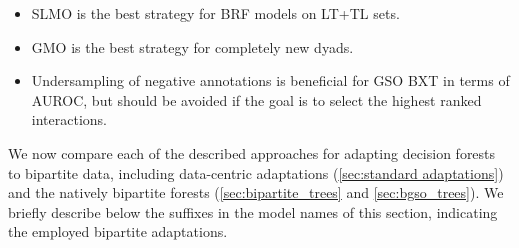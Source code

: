 \begin{mdframed}[frametitle={Key findings}]
    \begin{itemize}
        \item SLMO is the best strategy for BRF models on LT+TL sets.
        \item GMO is the best strategy for completely new dyads.
        \item Undersampling of negative annotations is beneficial for GSO BXT in terms of AUROC, but should be avoided if the goal is to select the highest ranked interactions.
    \end{itemize}
\end{mdframed}

We now compare each of the described approaches for adapting decision forests to bipartite data, including data-centric adaptations (\autoref{sec:standard adaptations}) and the natively bipartite forests (\autoref{sec:bipartite_trees} and \autoref{sec:bgso_trees}). We briefly describe below the suffixes in the model names of this section, indicating the employed bipartite adaptations.


